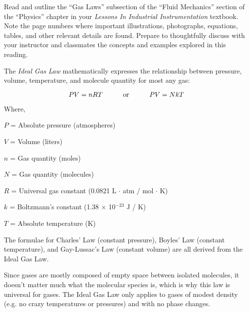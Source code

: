 
Read and outline the ``Gas Laws'' subsection of the ``Fluid Mechanics'' section of the ``Physics'' chapter in your {\it Lessons In Industrial Instrumentation} textbook.  Note the page numbers where important illustrations, photographs, equations, tables, and other relevant details are found.  Prepare to thoughtfully discuss with your instructor and classmates the concepts and examples explored in this reading.












The {\it Ideal Gas Law} mathematically expresses the relationship between pressure, volume, temperature, and molecule quantity for most any gas:

$$PV = nRT \hskip 30pt \hbox{or} \hskip 30pt PV = NkT$$

\noindent
Where,

$P$ = Absolute pressure (atmospheres)

$V$ = Volume (liters)

$n$ = Gas quantity (moles)

$N$ = Gas quantity (molecules)

$R$ = Universal gas constant (0.0821 L $\cdot$ atm / mol $\cdot$ K)

$k$ = Boltzmann's constant (1.38 $\times$ 10$^{-23}$ J / K)

$T$ = Absolute temperature (K)

\vskip 10pt

The formulae for Charles' Law (constant pressure), Boyles' Law (constant temperature), and Gay-Lussac's Law (constant volume) are all derived from the Ideal Gas Law.

\vskip 10pt

Since gases are mostly composed of empty space between isolated molecules, it doesn't matter much what the molecular species is, which is why this law is universal for gases.  The Ideal Gas Law only applies to gases of modest density (e.g. no crazy temperatures or pressures) and with no phase changes.


